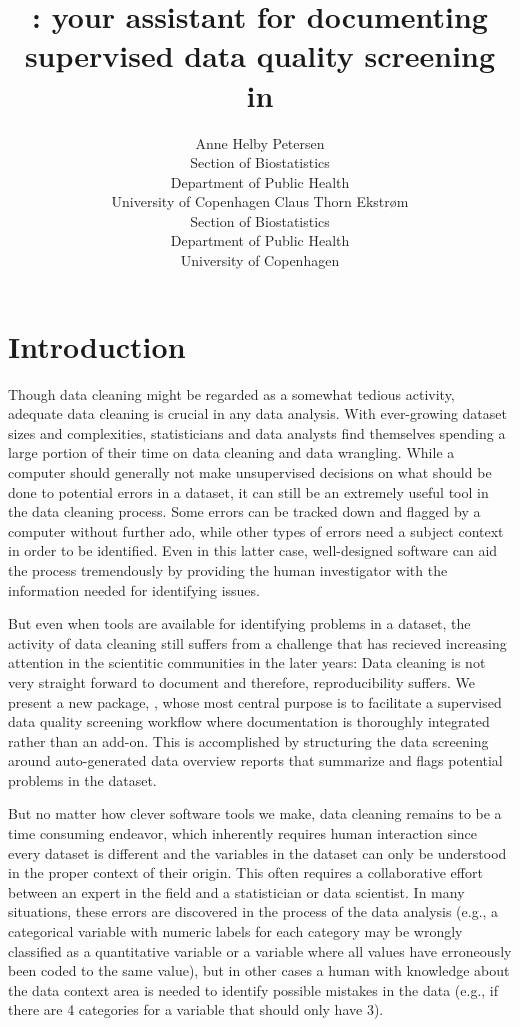 \documentclass[article,shortnames]{jss}
\author{Anne Helby Petersen\\Section of Biostatistics\\Department of Public
  Health\\University of Copenhagen \And Claus Thorn Ekstr\o m\\Section of Biostatistics\\Department of Public
  Health\\University of Copenhagen}
\title{\pkg{dataMaid}: your assistant for documenting supervised data quality screening in \proglang{R}}
\begin{document}
\section{Introduction}
Though data cleaning might be regarded as a somewhat tedious activity,
adequate data cleaning is crucial in any data analysis. With
ever-growing dataset sizes and complexities, statisticians and data
analysts find themselves spending a large portion of their time on
data cleaning and data wrangling. While a computer should generally not
make unsupervised decisions on what should be done to potential
errors in a dataset, it can still be an extremely useful tool in the
data cleaning process. Some errors can be tracked down and flagged by a
computer without further ado, while other types of errors need a subject
context in order to be identified. Even in this latter case, well-designed
software can aid the process tremendously by providing the human
investigator with the information needed for identifying issues.

But even when tools are available for identifying problems in a
dataset, the activity of data cleaning still suffers from a challenge
that has recieved increasing attention in the scientitic communities
in the later years: Data cleaning is not very straight forward to
document and therefore, reproducibility suffers. We present a new
 package,  \citep{dataMaid}, whose most
central purpose is to facilitate a supervised data quality screening
workflow where documentation is thoroughly integrated rather than an
add-on. This is accomplished by structuring the data screening around
auto-generated data overview reports that summarize and flags
potential problems in the dataset.


But no matter how clever software tools we make, data cleaning remains
to be a time consuming endeavor, which inherently requires human
interaction since every dataset is different and the variables in the
dataset can only be understood in the proper context of their
origin. This often requires a collaborative effort between an expert
in the field and a statistician or data scientist. In many
situations, these errors are discovered in the process of the data
analysis (e.g., a categorical variable with numeric labels for each
category may be wrongly classified as a quantitative variable or a
variable where all values have erroneously been coded to the same
value), but in other cases a human with knowledge about the data
context area is needed to identify possible mistakes in the data
(e.g., if there are 4 categories for a variable that should only have
3).
\end{document}
